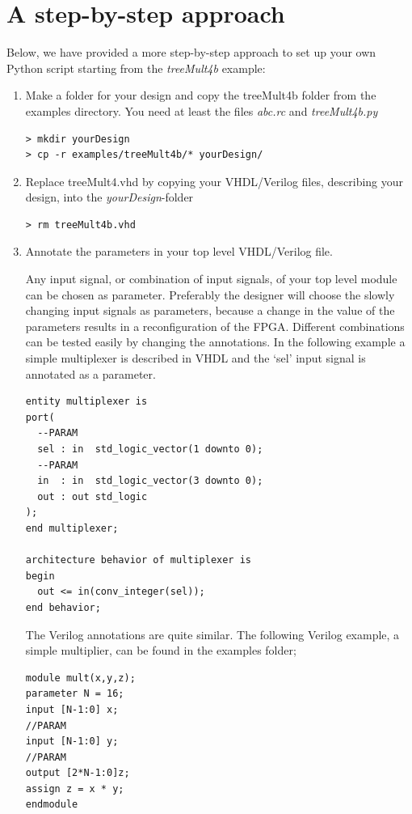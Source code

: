 \documentclass[a4paper,oneside]{memoir}
\begin{document}
\section{A step-by-step approach}\label{sec:step_by_step}
Below, we have provided a more step-by-step approach to set up your own Python script starting from the \emph{treeMult4b} example:
\begin{enumerate}
\item Make a folder for your design and copy the treeMult4b folder from the examples directory. You need at least the files \emph{abc.rc} and \emph{treeMult4b.py}
\begin{lstlisting}
> mkdir yourDesign
> cp -r examples/treeMult4b/* yourDesign/
\end{lstlisting}
\item Replace treeMult4.vhd by copying your VHDL/Verilog files, describing your design, into the \emph{yourDesign}-folder
\begin{lstlisting}
> rm treeMult4b.vhd
\end{lstlisting}
\item Annotate the parameters in your top level VHDL/Verilog file.

Any input signal, or combination of input signals, of your top level module can be chosen as parameter. Preferably the designer will choose the slowly changing input signals as parameters, because a change in the value of the parameters results in a reconfiguration of the FPGA. Different combinations can be tested easily by changing the annotations. In the following example a simple multiplexer is described in VHDL and the `sel' input signal is annotated as a parameter.
\lstset{language=VHDL}
\begin{lstlisting}
entity multiplexer is
port(
  --PARAM
  sel : in  std_logic_vector(1 downto 0);
  --PARAM
  in  : in  std_logic_vector(3 downto 0);
  out : out std_logic
);
end multiplexer;

architecture behavior of multiplexer is
begin
  out <= in(conv_integer(sel));
end behavior;
\end{lstlisting}
The Verilog annotations are quite similar. The following Verilog example, a simple multiplier, can be found in the examples folder;
\lstset{language=Verilog}
\begin{lstlisting}
module mult(x,y,z);
parameter N = 16;
input [N-1:0] x;
//PARAM
input [N-1:0] y;
//PARAM
output [2*N-1:0]z;
assign z = x * y;
endmodule
\end{lstlisting}
 

\end{enumerate}
\end{document}
